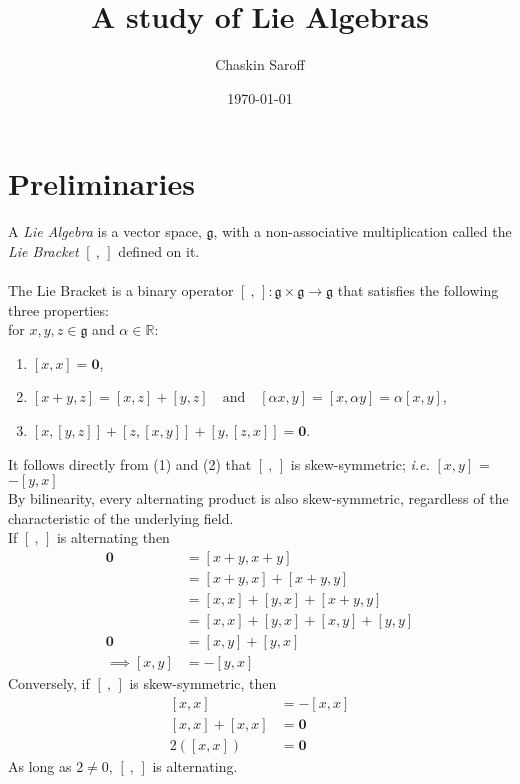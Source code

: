 \documentclass[11 pt]{article}
\title{A study of Lie Algebras}
\author{Chaskin Saroff}
\date{\today} \draft
\renewcommand{\a}{\alpha}
\newcommand{\br}[2]{\left[#1,#2\right]}
\newcommand{\bre}{\br{\ }{\,}}
\newcommand{\fg}{\mathfrak{g}}
\newcommand{\zvec}{\mathbf{0}}
\newcommand{\RR}{\mathbb{R}}
\begin{document}
\maketitle


\section{Preliminaries}

\begin{definition}

    A \emph{Lie Algebra} is a vector space, $\fg$, with a non-associative
    multiplication called the \emph{Lie Bracket} $\bre$ defined on it.
\\
\\The Lie Bracket is a binary operator $ \bre: \fg \times \fg \to \fg$
that satisfies the following three properties:
\\for $x,y,z \in \fg$ and $\a \in \RR$:
\begin{enumerate}
    \item  $\br{x}{x}=\zvec$,

    \item  $\br{x+y}{z} = \br{x}{z}+\br{y}{z}\quad
        \text{and} \quad \br{\a x}{y}=\br{x}{ \a y}=\a\br{x}{y}$,

    \item  $\br{x}{\br{y}{z}} + \br{z}{\br{x}{y}} + \br{y}{\br{z}{x}} = \zvec$.
\end{enumerate}
\end{definition}
It follows directly from (1) and (2) that $\bre$ is skew-symmetric;
\emph{i.e.} $\br{x}{y}$ = $-\br{y}{x}$
\\By bilinearity, every alternating product is also skew-symmetric, regardless
of the characteristic of the underlying field.
\\If $\bre$ is alternating then
    \begin{align}
        \zvec &= \br{x + y}{x + y}
        \\&= \br{x + y}{x} + \br{x + y}{y}
        \\&= \br{x}{x} + \br{y}{x} + \br{x + y}{y}
        \\&= \br{x}{x} + \br{y}{x} + \br{x}{y} + \br{y}{y}
        \\\zvec&=         \br{x}{y} + \br{y}{x}
        \\\implies \br{x}{y} &= -\br{y}{x}
    \end{align}
    Conversely, if $\bre$ is skew-symmetric, then
    \begin{align}
        \br{x}{x} &= -\br{x}{x}
        \\ \br{x}{x}+\br{x}{x}&=\zvec
        \\ 2(\br{x}{x})&=\zvec
    \end{align}
    As long as $2 \neq 0$, $\bre$ is alternating.
\end{document}
